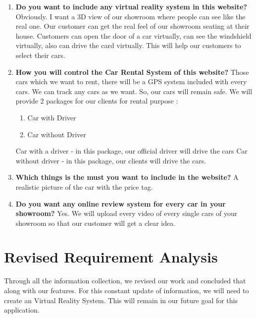 \begin{enumerate}
   
    \item \textbf{Do you want to include any virtual reality system in this website?}\newline
    \noindent \textbf{} Obviously. I want a 3D view of our showroom where people can see like the real one. Our customer can get the real feel of our showroom seating at their house. Customers can open the door of a car virtually, can see the windshield virtually, also can drive the card virtually. This will help our customers to select their cars.
    
    \item \textbf{How you will control the Car Rental System of this website?}\newline
    \noindent \textbf{}Those cars which we want to rent, there will be a GPS system included with every cars. We can track any cars as we want. So, our cars will remain safe. We will provide 2 packages for our clients for rental purpose :
	\begin{enumerate}
		\item Car with Driver
		\item Car without Driver		
	\end{enumerate}
	\noindent Car with a driver - in this package, our official driver will drive the cars \newline
	Car without driver - in this package, our clients will drive the cars.

    
    \item \textbf{Which things is the must you want to include in the website?}\newline
    \noindent \textbf{}A realistic picture of the car with the price tag.  
    
    \item \textbf{Do you want any online review system for every car in your showroom?}\newline
    \noindent \textbf{}Yes. We will upload every video of every single cars of your showroom so that our customer will get a clear idea.
    
    \end{enumerate}

\section{Revised Requirement Analysis}

\noindent Through all the information collection, we revised our work and concluded that along with our features. For this constant update of information, we will need to create an Virtual Reality System. This will remain in our future goal for this application.

